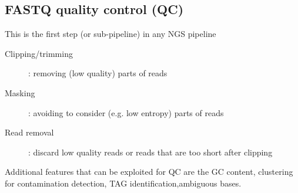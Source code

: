 \begin{description}
\subsection{FASTQ quality control (QC)}
This is the first step (or sub-pipeline) in any NGS pipeline 
\begin{description}
\item[Clipping/trimming]: removing (low quality) parts of reads
\item[Masking]: avoiding to consider (e.g. low entropy) parts of reads
\item[Read removal]: discard low quality reads or reads that are too short after clipping
\end{description}

Additional features that can be exploited for QC are the GC content, clustering for contamination detection, TAG identification,ambiguous bases. 











































\end{description}